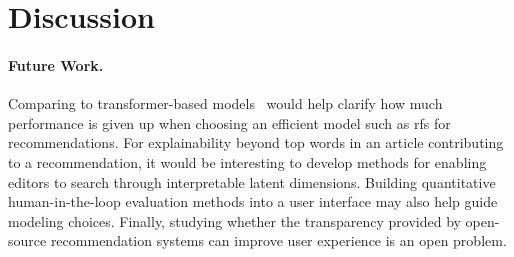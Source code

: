 \section{Discussion}
\paragraph{Future Work.} Comparing to transformer-based models~\citep{devlin2019bert:} would help clarify how much performance is given up when choosing an efficient model such as \gls{rfs} for recommendations. For explainability beyond top words in an article contributing to a recommendation, it would be interesting to develop methods for enabling editors to search through interpretable latent dimensions. Building quantitative human-in-the-loop evaluation methods into a user interface may also help guide modeling choices. Finally, studying whether the transparency provided by open-source recommendation systems can improve user experience is an open problem.